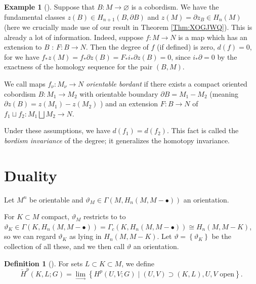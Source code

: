 \documentclass[reqno]{amsart}
\theoremstyle{definition}
\newtheorem{definition}[theorem]{Definition}
\newtheorem{example}[theorem]{Example}
\theoremstyle{remark}
\begin{document}
\begin{example}[]
    Suppose that
    $B \colon M \to \varnothing$ is a cobordism.
    We have the fundamental classes
    $z(B) \in H_{n+1}(B, \partial B)$ and
    $z(M) = \partial z_{B} \in 
    H_n (M)$ (here we crucially made use of our result
    in Theorem \ref{Thm:XOGJWQ}). This is already a lot of
    information. Indeed, suppose $f \colon M \to N$ is a 
    map which has an extension to $B$ : $F\colon B \to N$.
    Then the degree of $f$ (if defined) is zero,
    $d(f) = 0$, for we have
    $f_* z(M) = f_* \partial z(B) = 
    F_* i_* \partial z(B) = 0$, since
    $i_* \partial = 0$ by the exactness of the
    homology sequence for the pair
    $\left( B, M \right) $.

    We call maps $f_{\nu} \colon M_{\nu} \to N$ 
    \textit{orientable bordant} if there exists
    a compact oriented cobordism 
    $B \colon M_1 \to M_2$ with orientable
    boundary $\partial B = M_1 - M_2$ (meaning
    $\partial z(B) = z(M_1) - z(M_2)$ ) and an extension
    $F \colon B \to N$ of 
    $f_1 \sqcup  f_2 \colon M_1 \bigsqcup M_2 \to N$.

    Under these assumptions, we have
    $d(f_1) = d(f_2)$. This fact
    is called the \textit{bordism invariance} of the
    degree; it generalizes the homotopy invariance.
\end{example}


\section{Duality}

Let $M^{n}$ be orientable and $\vartheta_M \in 
\Gamma \left( M, H_n (M,M - \bullet) \right) $ an orientation.

For $K \subset M$ compact, $\vartheta_M$ restricts to
to
$\vartheta_K \in \Gamma \left( K, H_n (M, M - \bullet) \right)
    = \Gamma_c (K , H_n (M, M - \bullet)) 
    \cong H_n (M, M - K)$, so we can regard
    $\vartheta_K$ as lying in
    $H_n (M, M - K)$. Let
    $\vartheta = \left\{ \vartheta_K \right\} $ be the collection
    of all these, and we then call $\vartheta$ an
    orientation.


    \begin{definition}[]
        For sets $L \subset K \subset M$, we define
        \[
            \check{H}^{p} (K,L;G) =
            \lim_{\rightarrow} 
            \left\{ H^{p} (U,V;G)  \mid 
            \left( U, V \right) \supset (K, L), U, V
        \text{ open}\right\} .
        \] 
    \end{definition}
\end{document}
